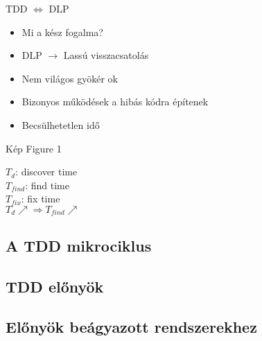\begin{frame}{TDD $\Leftrightarrow$ DLP}
  \begin{itemize}[<+->]
  \item Mi a kész fogalma?
  \item DLP $\rightarrow$ Lassú visszacsatolás
  \item Nem világos gyökér ok
  \item Bizonyos működések a hibás kódra építenek
  \item Becsülhetetlen idő
  \end{itemize}
\end{frame}

\begin{frame}{Kép}
  Figure 1

  $T_d$: discover time \\
  $T_{find}$: find time \\
  $T_{fix}$: fix time \\
  $T_d \nearrow \Rightarrow T_{find} \nearrow$
\end{frame}

\subsection{A TDD mikrociklus}

\subsection{TDD előnyök}

\subsection{Előnyök beágyazott rendszerekhez}


